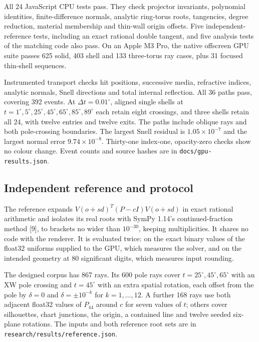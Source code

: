\documentclass[11pt,a4paper]{article}
\begin{document}
All 24 JavaScript CPU tests pass. They check projector invariants,
polynomial identities, finite-difference normals, analytic ring-torus
roots, tangencies, degree reduction, material membership and thin-wall
origin offsets. Five independent-reference tests, including an exact
rational double tangent, and five analysis tests of the matching code
also pass. On an Apple M3 Pro, the native offscreen GPU suite passes 625
solid, 403 shell and 133 three-torus ray cases, plus 31 focused
thin-shell sequences.

Instrumented transport checks hit positions, successive media,
refractive indices, analytic normals, Snell directions and total
internal reflection. All 36 paths pass, covering 392 events. At
\(\Delta t=0.01^\circ\), aligned single shells at
\(t=1^\circ,5^\circ,25^\circ,45^\circ,65^\circ,85^\circ,89^\circ\) each
retain eight crossings, and three shells retain all 24, with twelve
entries and twelve exits. The paths include oblique rays and both
pole-crossing boundaries. The largest Snell residual is
\(1.05\times10^{-7}\) and the largest normal error
\(9.74\times10^{-8}\). Thirty-one index-one, opacity-zero checks show no
colour change. Event counts and source hashes are in
\texttt{docs/gpu-results.json}.

\subsection{Independent reference and
protocol}\label{independent-reference-and-protocol}

The reference expands \(V(o+sd)^T(P-cI)V(o+sd)\) in exact rational
arithmetic and isolates its real roots with SymPy 1.14's
continued-fraction method {[}9{]}, to brackets no wider than
\(10^{-30}\), keeping multiplicities. It shares no code with the
renderer. It is evaluated twice: on the exact binary values of the
float32 uniforms supplied to the GPU, which measures the solver, and on
the intended geometry at 80 significant digits, which measures input
rounding.

The designed corpus has 867 rays. Its 600 pole rays cover
\(t=25^\circ,45^\circ,65^\circ\) with an XW pole crossing and
\(t=45^\circ\) with an extra spatial rotation, each offset from the pole
by \(\delta=0\) and \(\delta=\pm10^{-k}\) for \(k=1,\ldots,12\). A
further 168 rays use both adjacent float32 values of \(P_{44}\) around
\(c\) for seven values of \(t\); others cover silhouettes, chart
junctions, the origin, a contained line and twelve seeded six-plane
rotations. The inputs and both reference root sets are in
\texttt{research/results/reference.json}.
\end{document}
